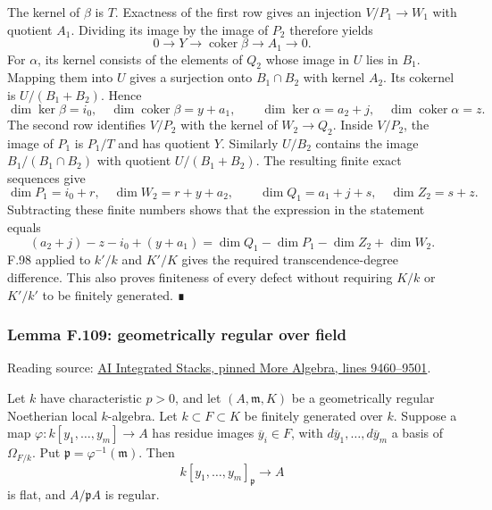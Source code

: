 \documentclass[11pt,a4paper,openany]{report}
\begin{document}
The kernel of \(\beta\) is \(T\). Exactness of the first row gives an injection \(V/P_1\to W_1\) with quotient \(A_1\). Dividing its image by the image of \(P_2\) therefore yields \[
0\longrightarrow Y\longrightarrow\operatorname{coker}\beta
\longrightarrow A_1\longrightarrow0.
\] For \(\alpha\), its kernel consists of the elements of \(Q_2\) whose image in \(U\) lies in \(B_1\). Mapping them into \(U\) gives a surjection onto \(B_1\cap B_2\) with kernel \(A_2\). Its cokernel is \(U/(B_1+B_2)\). Hence \[
\dim\ker\beta=i_0,\quad \dim\operatorname{coker}\beta=y+a_1,
\qquad \dim\ker\alpha=a_2+j,\quad \dim\operatorname{coker}\alpha=z.
\] The second row identifies \(V/P_2\) with the kernel of \(W_2\to Q_2\). Inside \(V/P_2\), the image of \(P_1\) is \(P_1/T\) and has quotient \(Y\). Similarly \(U/B_2\) contains the image \(B_1/(B_1\cap B_2)\) with quotient \(U/(B_1+B_2)\). The resulting finite exact sequences give \[
\dim P_1=i_0+r,\quad \dim W_2=r+y+a_2,
\qquad \dim Q_1=a_1+j+s,\quad \dim Z_2=s+z.
\] Subtracting these finite numbers shows that the expression in the statement equals \[
(a_2+j)-z-i_0+(y+a_1)
=\dim Q_1-\dim P_1-\dim Z_2+\dim W_2.
\] F.98 applied to \(k'/k\) and \(K'/K\) gives the required transcendence-degree difference. This also proves finiteness of every defect without requiring \(K/k\) or \(K'/k'\) to be finitely generated. ∎

\label{AG-RG-S05-more-algebra-lemma-geometrically-regular-over-field}

\subsubsection{Lemma F.109: geometrically regular over field}\label{AG-RG-S05-lemma-f.109-geometrically-regular-over-field}

Reading source: \href{https://github.com/KokunoYumeto/unofficial-stacks-project-ai-drafts/blob/565b10e987aba5969b21145a0833f42d69f96790/more-algebra.tex\#L9460-L9501}{AI Integrated Stacks, pinned More Algebra, lines 9460--9501}.

Let \(k\) have characteristic \(p>0\), and let \((A,\mathfrak m,K)\) be a geometrically regular Noetherian local \(k\)-algebra. Let \(k\subset F\subset K\) be finitely generated over \(k\). Suppose a map \(\varphi:k[y_1,\ldots,y_m]\to A\) has residue images \(\overline y_i\in F\), with \(d\overline y_1,\ldots,d\overline y_m\) a basis of \(\Omega_{F/k}\). Put \(\mathfrak p=\varphi^{-1}(\mathfrak m)\). Then \[k[y_1,\ldots,y_m]_{\mathfrak p}\longrightarrow A\] is flat, and \(A/\mathfrak pA\) is regular.
\end{document}
